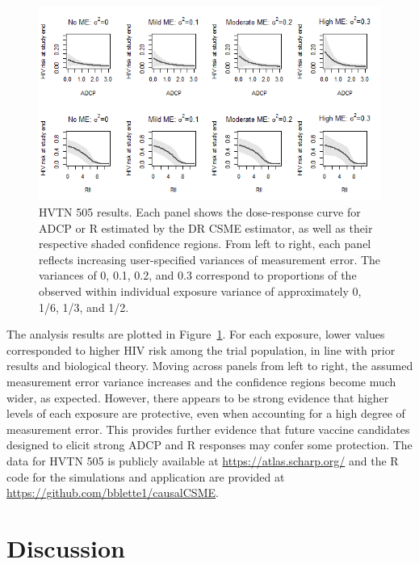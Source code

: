 \documentclass[useAMS,usenatbib,referee]{biom}
\newcommand{\RNum}[1]{\uppercase\expandafter{\romannumeral #1\relax}}
\begin{document}
\begin{figure}[h!]
\centering
\includegraphics[width=5.9in]{fig3.png}
\caption{HVTN 505 results. Each panel shows the dose-response curve for ADCP or R\RNum{2} estimated by the DR CSME estimator, as well as their respective shaded confidence regions. From left to right, each panel reflects increasing user-specified variances of measurement error. The variances of 0, 0.1, 0.2, and 0.3 correspond to proportions of the observed within individual exposure variance of approximately 0, 1/6, 1/3, and 1/2.}
\label{fig:three}
\end{figure}

The analysis results are plotted in Figure~\ref{fig:three}. For each exposure, lower values corresponded to higher HIV risk among the trial population, in line with prior results and biological theory. Moving across panels from left to right, the assumed measurement error variance increases and the confidence regions become much wider, as expected. However, there appears to be strong evidence that higher levels of each exposure are protective, even when accounting for a high degree of measurement error. This provides further evidence that future vaccine candidates designed to elicit strong ADCP and R\RNum{2} responses may confer some protection. The data for HVTN 505 is publicly available at \href{https://atlas.scharp.org/cpas/project/HVTN\%20Public\%20Data/HVTN\%20505/begin.view?}{https://atlas.scharp.org/} and the R code for the simulations and application are provided at \href{https://github.com/bblette1/causalCSME}{https://github.com/bblette1/causalCSME}.

\section{Discussion}
\end{document}
